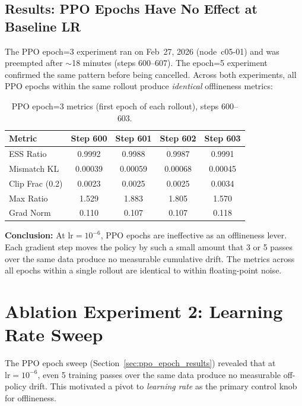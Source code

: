 \documentclass[11pt,a4paper]{article}
\begin{document}
\subsection{Results: PPO Epochs Have No Effect at Baseline LR}

The PPO epoch=3 experiment ran on Feb~27, 2026 (node~c05-01) and was preempted
after $\sim$18 minutes (steps 600--607). The epoch=5 experiment confirmed the
same pattern before being cancelled. Across both experiments, all PPO epochs
within the same rollout produce \emph{identical} offlineness metrics:

\begin{table}[H]
\centering
\caption{PPO epoch=3 metrics (first epoch of each rollout), steps 600--603.}
\label{tab:ppo3_early}
\begin{tabular}{@{}lcccc@{}}
\toprule
\textbf{Metric} & \textbf{Step 600} & \textbf{Step 601} & \textbf{Step 602} & \textbf{Step 603} \\
\midrule
ESS Ratio      & 0.9992 & 0.9988 & 0.9987 & 0.9991 \\
Mismatch KL    & 0.00039 & 0.00059 & 0.00068 & 0.00045 \\
Clip Frac (0.2) & 0.0023 & 0.0025 & 0.0025 & 0.0034 \\
Max Ratio       & 1.529  & 1.883  & 1.805  & 1.570  \\
Grad Norm       & 0.110  & 0.107  & 0.107  & 0.118  \\
\bottomrule
\end{tabular}
\end{table}

\textbf{Conclusion:} At $\mathrm{lr} = 10^{-6}$, PPO epochs are ineffective as
an offlineness lever. Each gradient step moves the policy by such a small amount
that 3 or 5 passes over the same data produce no measurable cumulative drift.
The metrics across all epochs within a single rollout are identical to within
floating-point noise.


\section{Ablation Experiment 2: Learning Rate Sweep}
\label{sec:lr_sweep_results}

The PPO epoch sweep (Section~\ref{sec:ppo_epoch_results}) revealed that at
$\mathrm{lr} = 10^{-6}$, even 5 training passes over the same data produce no
measurable off-policy drift. This motivated a pivot to \emph{learning rate} as
the primary control knob for offlineness.
\end{document}
